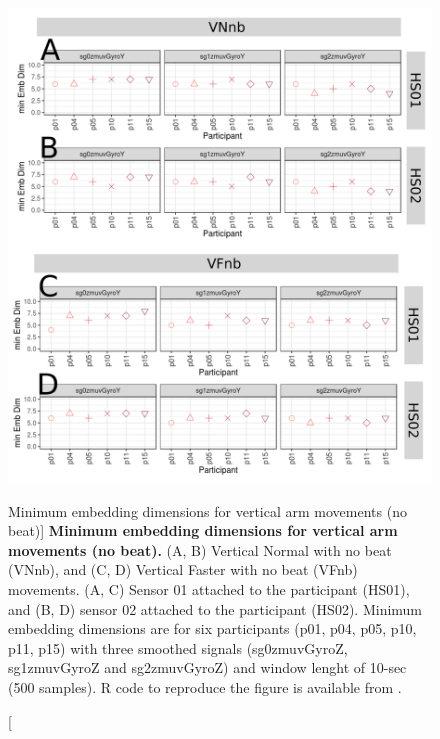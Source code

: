 \begin{figure}
\centering
\includegraphics[width=1.0\textwidth]{cao_Vnb_w10}
	\caption
	[Minimum embedding dimensions for vertical arm movements 
	(no beat)]{
	{\bf Minimum embedding dimensions for vertical arm movements 
	(no beat).} 
		(A, B) Vertical Normal with no beat (VNnb), and 
		(C, D) Vertical Faster with no beat (VFnb) movements.
		(A, C) Sensor 01 attached to the participant (HS01), and
		(B, D) sensor 02 attached to the participant (HS02).
		Minimum embedding dimensions are for six participants 
		(p01, p04, p05, p10, p11, p15) with three smoothed signals 
		(sg0zmuvGyroZ, sg1zmuvGyroZ and sg2zmuvGyroZ)
		and window lenght of 10-sec (500 samples).
		R code to reproduce the figure is available 
		from \cite{xochicale2018}.
        }
    \label{fig:caoVnb}
\end{figure}
